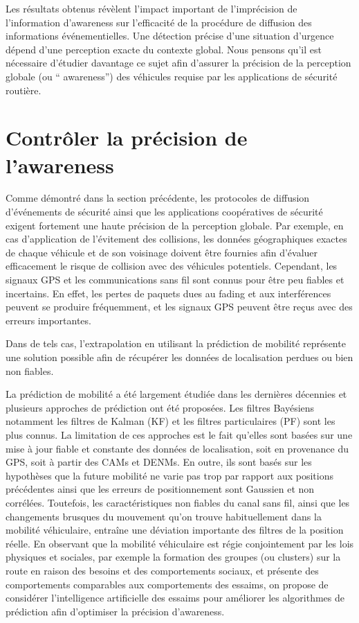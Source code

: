Les résultats obtenus révèlent l'impact important de l'imprécision de l'information d'awareness sur l'efficacité de la procédure de diffusion des informations événementielles. Une détection précise d'une situation d'urgence dépend d'une perception exacte du contexte global. Nous pensons qu'il est nécessaire d'étudier davantage ce sujet afin d'assurer la précision de la perception globale (ou `` awareness'') des véhicules requise par les applications de sécurité routière.

\section{Contrôler la précision de l'awareness\label{cont2}}

Comme démontré dans la section précédente, les protocoles de diffusion d'événements de sécurité ainsi que les applications coopératives de sécurité exigent fortement une haute précision de la perception globale. Par exemple, en cas d'application de l'évitement des collisions, les données géographiques exactes de chaque véhicule et de son voisinage doivent être fournies afin d'évaluer efficacement le risque de collision avec des véhicules potentiels. Cependant, les signaux GPS et les communications sans fil sont connus pour être peu fiables et incertains. En effet, les pertes de paquets dues au fading et aux interférences peuvent se produire fréquemment, et les signaux GPS peuvent être reçus avec des erreurs importantes.

Dans de tels cas, l'extrapolation en utilisant la prédiction de mobilité représente une solution possible afin de récupérer les données de localisation perdues ou bien non fiables.

La prédiction de mobilité a été largement étudiée dans les dernières décennies et plusieurs approches de prédiction ont été proposées. Les filtres Bayésiens notamment les filtres de Kalman (KF) \cite{kf} et les filtres particulaires (PF) \cite{pf1} sont les plus connus. La limitation de ces approches est le fait qu'elles sont basées sur une mise à jour fiable et constante des données de localisation, soit en provenance du GPS, soit à partir des CAMs et DENMs. En outre, ils sont basés sur les hypothèses que la future mobilité ne varie pas trop par rapport aux positions précédentes ainsi que les erreurs de positionnement sont Gaussien et non corrélées.
%
Toutefois, les caractéristiques non fiables du canal sans fil, ainsi que les changements brusques du mouvement qu'on trouve habituellement dans la mobilité véhiculaire, entra\^ine une déviation importante des filtres de la position réelle. En observant que la mobilité véhiculaire est régie conjointement par les lois physiques et sociales, par exemple la formation des groupes (ou clusters) sur la route en raison des besoins et des comportements sociaux, et présente des comportements comparables aux comportements des essaims, on propose de considérer l'intelligence artificielle des essaims pour améliorer les algorithmes de prédiction afin d'optimiser la précision d'awareness.

